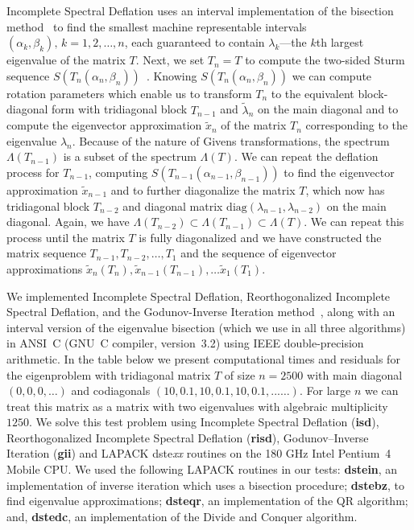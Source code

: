 \documentclass{report}
\begin{document}
Incomplete Spectral Deflation uses an interval implementation of
the bisection method~\cite{garant:eng, matsekh_imacs} to find the
smallest machine representable intervals $(\alpha_k,
\beta_k),\,k=1, 2, \ldots, n$, each guaranteed to contain
$\lambda_k$---the $k$th largest eigenvalue of the matrix $T$.
Next, we set $T_n= T$ to compute the two-sided Sturm sequence
$S(T_n(\alpha_n, \beta_n))$~\cite{garant:eng, matsekh_imacs}.
Knowing $S(T_n(\alpha_n, \beta_n))$ we can compute rotation
parameters which enable us to transform $T_n$ to the equivalent
block-diagonal form with tridiagonal block $T_{n-1}$ and
$\tilde{\lambda}_n$ on the main diagonal and to compute the
eigenvector approximation $\tilde{x}_n$ of the matrix $T_n$
corresponding to the eigenvalue $\lambda_n$. Because of the
nature of Givens transformations, the spectrum $\Lambda(T_{n-1})$
is a subset of the spectrum $\Lambda(T)$. We can repeat the
deflation process for $T_{n-1}$, computing
$S(T_{n-1}(\alpha_{n-1}, \beta_{n-1}))$ to find the eigenvector
approximation $\tilde{x}_{n-1}$ and to further diagonalize the
matrix $T$, which now has tridiagonal block $T_{n-2}$ and
diagonal matrix $\mathrm{diag}(\lambda_{n-1}, \lambda_{n-2})$ on
the main diagonal. Again, we have $\Lambda(T_{n-2}) \subset
\Lambda(T_{n-1}) \subset \Lambda(T)$. We can repeat this process
until the matrix $T$ is fully diagonalized and we have
constructed the matrix sequence $T_{n-1}, T_{n-2}, \ldots, T_{1}$
and the sequence of eigenvector approximations $\tilde{x}_n(T_n),
\tilde{x}_{n-1}(T_{n-1}), \ldots \tilde{x}_1(T_1)$.

We implemented Incomplete Spectral Deflation, Reorthogonalized
Incomplete Spectral Deflation, and the Godunov-Inverse Iteration
method~\cite{matsekh_imacs}, along with an interval version of
the eigenvalue bisection (which we use in all three algorithms)
in ANSI~C (GNU~C compiler, version~3.2) using IEEE
double-precision arithmetic. In the table below we present
computational times and residuals for the eigenproblem with
tridiagonal matrix $T$ of size $n=2500$ with main diagonal $(0,
0, 0, \ldots)$ and codiagonals $(10, 0.1, 10, 0.1, 10, 0.1,
...\ldots)$. For large $n$ we can treat this matrix as a matrix
with two eigenvalues with algebraic multiplicity $1250$. We
solve this test problem using Incomplete Spectral Deflation
(\textbf{isd}), Reorthogonalized Incomplete Spectral Deflation
(\textbf{risd}), Godunov--Inverse Iteration (\textbf{gii}) and
LAPACK dste\emph{xx} routines on the 180 GHz
Intel\textregistered{} Pentium~4 Mobile\textregistered{} CPU\@.
We used the following LAPACK routines in our tests:
\textbf{dstein}, an implementation of inverse iteration which
uses a bisection procedure; \textbf{dstebz}, to find eigenvalue
approximations; \textbf{dsteqr}, an implementation of the QR
algorithm; and, \textbf{dstedc}, an implementation of the Divide
and Conquer algorithm.
\end{document}
